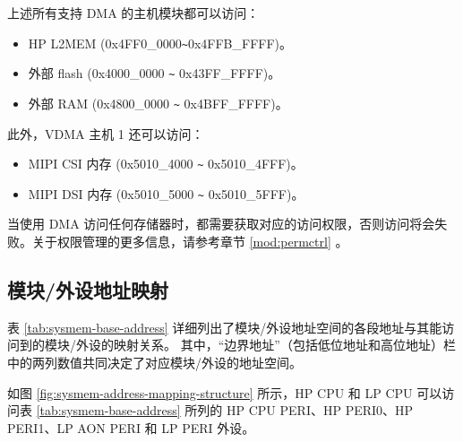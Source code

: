 \documentclass[main\_\_CN.tex]{subfiles}
\begin{document}
上述所有支持 DMA 的主机模块都可以访问：
\begin{itemize}
    \item HP L2MEM (0x4FF0\_0000\verb+~+0x4FFB\_FFFF)。
    \item 外部 flash (0x4000\_0000 \verb+~+ 0x43FF\_FFFF)。
    \item 外部 RAM (0x4800\_0000 \verb+~+ 0x4BFF\_FFFF)。
    \end{itemize}
此外，VDMA 主机 1 还可以访问：
\begin{itemize}
    \item MIPI CSI 内存 (0x5010\_4000 \verb+~+ 0x5010\_4FFF)。
    \item MIPI DSI 内存 (0x5010\_5000 \verb+~+ 0x5010\_5FFF)。
\end{itemize}

\begin{tiplisting}
当使用 DMA 访问任何存储器时，都需要获取对应的访问权限，否则访问将会失败。关于权限管理的更多信息，请参考章节  \ref{mod:permctrl} \textit{}。
\end{tiplisting}

\subsection{模块/外设地址映射}
\label{para:sysmem-mod-peri-add-mapping}

表 \ref{tab:sysmem-base-address} 详细列出了模块/外设地址空间的各段地址与其能访问到的模块/外设的映射关系。
其中，“边界地址”（包括低位地址和高位地址）栏中的两列数值共同决定了对应模块/外设的地址空间。



\begin{tiplisting}
如图 \ref{fig:sysmem-address-mapping-structure} 所示，HP CPU 和 LP CPU 可以访问表 \ref{tab:sysmem-base-address} 所列的 HP CPU PERI、HP PERI0、HP PERI1、LP AON PERI 和 LP PERI 外设。
\end{tiplisting}
\end{document}
